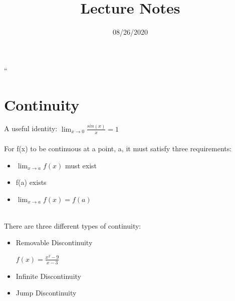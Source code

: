 \documentclass{article}
\begin{document}
\title{Lecture Notes}
\date{08/26/2020}
\maketitle

``\section{Continuity}
A useful identity: $\lim_{x \to 0}\frac{sin(x)}{x}=1$\\
\\
For f(x) to be continuous at a point, a, it must satisfy three requirements:
\begin{itemize}
\item $\lim_{x \to a}f(x)$ must exist
\item f(a) exists
\item $\lim_{x \to a}f(x) = f(a)$
\end{itemize}
\\
There are three different types of continuity:
\begin{itemize}
\item Removable Discontinuity
\begin{itemize}
$f(x)=\frac{x^2-9}{x-3}$
\end{itemize}
\item Infinite Discontinuity
\item Jump Discontinuity
\end{itemize}
\end{document}
